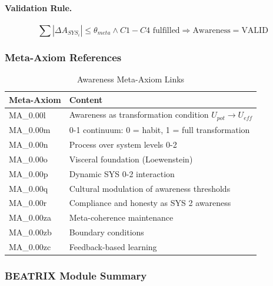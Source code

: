 \paragraph{Validation Rule.}
\begin{equation}
\sum |\Delta A_{SYS_i}| \leq \theta_{meta} \wedge C1-C4 \text{ fulfilled} \Rightarrow \text{Awareness} = \text{VALID}
\end{equation}

\subsubsection{Meta-Axiom References}

\begin{table}[htbp]
\centering
\caption{Awareness Meta-Axiom Links}
\label{tab:meta-axioms}
\renewcommand{\arraystretch}{1.3}
\begin{tabular}{@{}ll@{}}
\toprule
\textbf{Meta-Axiom} & \textbf{Content} \\
\midrule
MA\_0.00l & Awareness as transformation condition $U_{pot} \to U_{eff}$ \\
MA\_0.00m & 0-1 continuum: 0 = habit, 1 = full transformation \\
MA\_0.00n & Process over system levels 0-2 \\
MA\_0.00o & Visceral foundation (Loewenstein) \\
MA\_0.00p & Dynamic SYS 0-2 interaction \\
MA\_0.00q & Cultural modulation of awareness thresholds \\
MA\_0.00r & Compliance and honesty as SYS 2 awareness \\
MA\_0.00za & Meta-coherence maintenance \\
MA\_0.00zb & Boundary conditions \\
MA\_0.00zc & Feedback-based learning \\
\bottomrule
\end{tabular}
\end{table}

\subsubsection{BEATRIX Module Summary}

